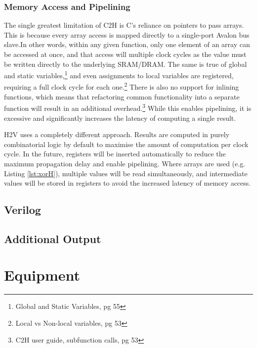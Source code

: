 \documentclass[english,onecolumn]{article}
\begin{document}
\subsubsection{Memory Access and Pipelining}
The single greatest limitation of C2H is C's reliance on pointers to pass arrays. This is because every array access is mapped directly to a single-port Avalon bus slave.\footnotemark In other words, within any given function, only one element of an array can be accessed at once, and that access will multiple clock cycles as the value must be written directly to the underlying SRAM/DRAM.
The same is true of global and static variables,\footnote{Global and Static Variables, pg 55} and even assignments to local variables are registered, requiring a full clock cycle for each one.\footnote{Local vs Non-local variables, pg 53}
There is also no support for inlining functions, which means that refactoring common functionality into a separate function will result in an additional overhead.\footnote{C2H user guide, subfunction calls, pg 53}
While this enables pipelining, it is excessive and significantly increases the latency of computing a single result.

H2V uses a completely different approach. Results are computed in purely combinatorial logic by default to maximise the amount of computation per clock cycle. In the future, registers will be inserted automatically to reduce the maximum propagation delay and enable pipelining. Where arrays are used (e.g. Listing \ref{lst:xorH}), multiple values will be read simultaneously, and intermediate values will be stored in registers to avoid the increased latency of memory access.

\subsection{Verilog}


\subsection{Additional Output}


\section{Equipment}
\end{document}
